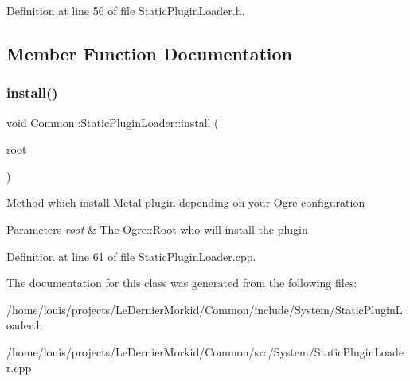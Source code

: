 Definition at line 56 of file Static\+Plugin\+Loader.\+h.



\subsection{Member Function Documentation}
\mbox{\label{class_common_1_1_static_plugin_loader_ad53a802ca29d709d2e2731be6304d274}} 
\subsubsection{\texorpdfstring{install()}{install()}}
{\footnotesize\ttfamily void Common\+::\+Static\+Plugin\+Loader\+::install (\begin{DoxyParamCaption}\item[{Ogre\+::\+Root $\ast$}]{root }\end{DoxyParamCaption})}

Method which install Metal plugin depending on your Ogre configuration 
\begin{DoxyParams}{Parameters}
{\em root} & The Ogre\+::\+Root who will install the plugin \\
\hline
\end{DoxyParams}


Definition at line 61 of file Static\+Plugin\+Loader.\+cpp.



The documentation for this class was generated from the following files\+:\begin{DoxyCompactItemize}
\item 
/home/louis/projects/\+Le\+Dernier\+Morkid/\+Common/include/\+System/Static\+Plugin\+Loader.\+h\item 
/home/louis/projects/\+Le\+Dernier\+Morkid/\+Common/src/\+System/Static\+Plugin\+Loader.\+cpp\end{DoxyCompactItemize}
